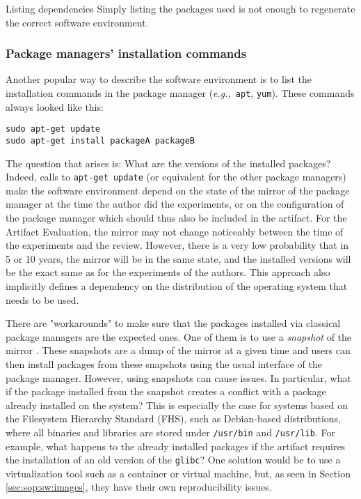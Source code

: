 \documentclass[sigconf,natbib=false]{acmart}
\newcommand{\eg}{\emph{e.g.,}}
\newcommand{\aeval}{Artifact Evaluation}
\begin{document}
\begin{lesson}{Listing dependencies}{}
  Simply listing the packages used is not enough to regenerate the correct software environment.
\end{lesson}

\subsubsection{Package managers' installation commands}

Another popular way to describe the software environment is to list the installation commands in the package manager (\eg\ \texttt{apt}, \texttt{yum}).
These commands always looked like this:

\begin{verbatim}
sudo apt-get update
sudo apt-get install packageA packageB
\end{verbatim}

The question that arises is: What are the versions of the installed packages?
Indeed, calls to \texttt{apt-get update} (or equivalent for the other package managers) make the software environment depend on the state of the mirror of the package manager at the time the author did the experiments, or on the configuration of the package manager which should thus also be included in the artifact.
For the \aeval, the mirror may not change noticeably between the time of the experiments and the review.
However, there is a very low probability that in 5 or 10 years, the mirror will be in the same state, and the installed versions will be the exact same as for the experiments of the authors.
This approach also implicitly defines a dependency on the distribution of the operating system that needs to be used.

There are "workarounds" to make sure that the packages installed via classical package managers are the expected ones. 
One of them is to use a \emph{snapshot} of the mirror \cite{debian-snapshot}.
These snapshots are a dump of the mirror at a given time and users can then install packages from these snapshots using the usual interface of the package manager.
However, using snapshots can cause issues.
In particular, what if the package installed from the snapshot creates a conflict with a package already installed on the system?
This is especially the case for systems based on the Filesystem Hierarchy Standard (FHS), such as Debian-based distributions, where all binaries and libraries are stored under \texttt{/usr/bin} and \texttt{/usr/lib}.
For example, what happens to the already installed packages if the artifact requires the installation of an old version of the \texttt{glibc}? 
One solution would be to use a virtualization tool such as a container or virtual machine, but, as seen in Section \ref{sec:sop:sw:images}, they have their own reproducibility issues.
\end{document}
